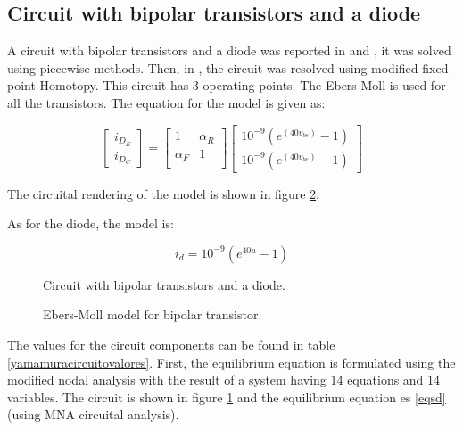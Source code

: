 \documentclass[conference,letterpaper,onecolumn]{IEEEtran}
\begin{document}
{\subsection{Circuit with bipolar transistors and a diode}

A circuit with bipolar transistors and a diode was reported in \cite{homo_tadeusiewicz} and  \cite{homo_yamamurawise}, it was solved using piecewise methods. Then, in \cite{homo_yamamura}, the circuit was resolved using modified fixed point Homotopy. This circuit has 3 operating points. The Ebers-Moll is used for all the transistors. The equation for the model is given as:

\begin{displaymath}
\left[ \begin{array}{c}
i_{D_E} \\
i_{D_C}
\end{array}\right] =
\left[ \begin{array}{cc} 1  & \alpha_R \\
\alpha_F & 1 \\
\end{array}\right] \left[ \begin{array}{c}
10^{-9}(e^{(40v_{be})} - 1) \\
10^{-9}(e^{(40v_{bc})} - 1)
\end{array}\right]
\end{displaymath}

The circuital rendering of the model is shown in figure \ref{FEbersMoll}.

As for the diode, the model is:

\begin{displaymath}
i_d=10^{-9}(e^{40u} - 1)
\end{displaymath}

\begin{figure}[tbp]
\centerline{
\epsfxsize=110mm
}
\caption{Circuit with bipolar transistors and a diode.}
\label{yamamuracircuito}
\end{figure}

\begin{figure}[hbtp]
\centerline{
\epsfxsize=36mm
}
\caption{Ebers-Moll model for bipolar transistor.}
\label{FEbersMoll}
\end{figure}

The values for the circuit components can be found in table \ref{yamamuracircuitovalores}. First, the equilibrium equation is formulated using the modified nodal analysis with the result of a system having 14 equations and 14 variables. The circuit is shown in figure \ref{yamamuracircuito} and the equilibrium equation es \ref{eqsd} (using MNA circuital analysis).

}
\end{document}
